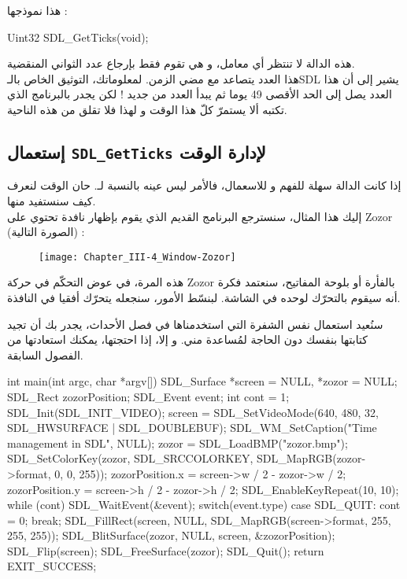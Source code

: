 هذا نموذجها :

\begin{Csource}
Uint32 SDL_GetTicks(void);
\end{Csource}

هذه الدالة لا تنتظر أي معامل، و هي تقوم فقط بإرجاع عدد الثواني المنقضية. \\
هذا العدد يتصاعد مع مضي الزمن. لمعلوماتك، التوثيق الخاص بالـ\textenglish{SDL}
يشير إلى أن هذا العدد يصل إلى الحد الأقصى 49 يوما ثم يبدأ العدد من جديد ! لكن يجدر بالبرنامج الذي تكتبه ألا يستمرّ كلّ هذا الوقت و لهذا فلا تقلق من هذه الناحية.

\subsection{إستعمال \texttt{SDL\_GetTicks} لإدارة الوقت}

إذا كانت الدالة
سهلة للفهم و للاسعمال، فالأمر ليس عينه بالنسبة لـ.
حان الوقت لنعرف كيف سنستفيد منها.\\
إليك هذا المثال، سنسترجع البرنامج القديم الذي يقوم بإظهار نافدة تحتوي على
\textenglish{Zozor}
(الصورة التالية) :

\begin{figure}[H]
	\centering
	\texttt{[image: Chapter\_III-4\_Window-Zozor]}
\end{figure}

هذه المرة، في عوض التحكّم في حركة
\textenglish{Zozor}
بالفأرة أو بلوحة المفاتيح، سنعتمد فكرة أنه سيقوم بالتحرّك لوحده في الشاشة. لبنسّط الأمور، سنجعله يتحرّك أفقيا في النافذة. 

سنُعيد استعمال نفس الشفرة التي استخدمناها في فصل الأحداث، يجدر بك أن تجيد كتابتها بنفسك دون الحاجة لمُساعدة مني. و إلا،  إذا احتجتها، يمكنك استعادتها من الفصول السابقة.

\begin{Csource}
int main(int argc, char *argv[])
{
	SDL_Surface *screen = NULL, *zozor = NULL;
	SDL_Rect zozorPosition;
	SDL_Event event;
	int cont = 1;
	SDL_Init(SDL_INIT_VIDEO);
	screen = SDL_SetVideoMode(640, 480, 32, SDL_HWSURFACE | SDL_DOUBLEBUF);
	SDL_WM_SetCaption("Time management in SDL", NULL);
	zozor = SDL_LoadBMP("zozor.bmp");
	SDL_SetColorKey(zozor, SDL_SRCCOLORKEY, SDL_MapRGB(zozor->format, 0, 0, 255));
	zozorPosition.x = screen->w / 2 - zozor->w / 2;
	zozorPosition.y = screen->h / 2 - zozor->h / 2;
	SDL_EnableKeyRepeat(10, 10);
	while (cont)
	{
		SDL_WaitEvent(&event);
		switch(event.type)
		{
			case SDL_QUIT:
			cont = 0;
			break;
		}
		SDL_FillRect(screen, NULL, SDL_MapRGB(screen->format, 255, 255, 255));
		SDL_BlitSurface(zozor, NULL, screen, &zozorPosition);
		SDL_Flip(screen);
	}
	SDL_FreeSurface(zozor);
	SDL_Quit();
	return EXIT_SUCCESS;
}
\end{Csource}

